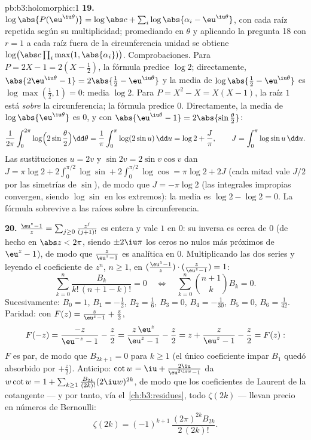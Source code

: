 \begin{solution}{pb:b3:holomorphic:1}
\textbf{19.} $\log\abs{P(\eu^{\iu\theta})} = \log\abs c +
\sum_i\log\abs{\alpha_i - \eu^{\iu\theta}}$, con cada raíz repetida
según su multiplicidad; promediando en $\theta$ y aplicando la pregunta
18 con $r = 1$ a cada raíz fuera de la circunferencia unidad se obtiene
$\log\bigl(\abs c\prod_i\max(1,
\abs{\alpha_i})\bigr)$. Comprobaciones. Para $P = 2X - 1 = 2(X -
\frac12)$, la fórmula predice $\log 2$; directamente,
$\abs{2\eu^{\iu\theta} - 1} = 2\abs{\frac12 -
\eu^{\iu\theta}}$ y la media de $\log\abs{\frac12 -
\eu^{\iu\theta}}$ es $\log\max(\frac12, 1) = 0$: media $\log
2$. Para $P = X^2 - X = X(X - 1)$, la raíz $1$ está \emph{sobre} la
circunferencia; la fórmula predice $0$. Directamente, la media de
$\log\abs{\eu^{\iu\theta}}$ es $0$, y con
$\abs{\eu^{\iu\theta} - 1} = 2\abs{\sin\frac\theta2}$:
\[
\frac1{2\pi}\int_0^{2\pi}
\log\Bigl(2\sin\frac\theta2\Bigr)\dd\theta
= \frac1\pi\int_0^\pi\log(2\sin u)\,\dd u
= \log 2 + \frac J\pi,
\qquad J = \int_0^\pi\log\sin u\,\dd u .
\]
Las sustituciones $u = 2v$ y $\sin 2v = 2\sin v\cos v$ dan
$J = \pi\log2 + 2\int_0^{\pi/2}\log\sin +
2\int_0^{\pi/2}\log\cos = \pi\log 2 + 2J$ (cada mitad vale $J/2$ por las
simetrías de $\sin$), de modo que $J = -\pi\log 2$ (las integrales
impropias convergen, siendo $\log\sin$
 en los extremos): la media es
$\log2 - \log2 = 0$. La fórmula sobrevive a las raíces sobre la
circunferencia.

\textbf{20.} $\frac{\eu^z - 1}z =
\sum_{j\geq0}\frac{z^j}{(j+1)!}$ es entera y vale $1$ en $0$: su inversa
es  cerca de $0$ (de hecho en
$\abs z <
2\pi$, siendo $\pm2\iu\pi$ los ceros no nulos más próximos de
$\eu^z - 1$), de modo que $\frac z{\eu^z-1}$ es analítica en $0$.
Multiplicando las dos series y leyendo el coeficiente de $z^n$,
$n \geq 1$, en $(\frac{\eu^z-1}z)\cdot(\frac
z{\eu^z-1}) = 1$:
\[
\sum_{k=0}^{n}\frac{B_k}{k!\,(n+1-k)!} = 0
\quad\Longleftrightarrow\quad
\sum_{k=0}^{n}\binom{n+1}{k}B_k = 0 .
\]
Sucesivamente: $B_0 = 1$, $B_1 = -\frac12$, $B_2 = \frac16$, $B_3 = 0$,
$B_4 = -\frac1{30}$, $B_5 = 0$, $B_6 =
\frac1{42}$. Paridad: con $F(z) = \frac z{\eu^z-1} +
\frac z2$,
\[
F(-z) = \frac{-z}{\eu^{-z} - 1} - \frac z2
= \frac{z\,\eu^z}{\eu^z - 1} - \frac z2
= z + \frac{z}{\eu^z - 1} - \frac z2 = F(z) :
\]
$F$ es par, de modo que $B_{2k+1} = 0$ para $k \geq 1$ (el único
coeficiente impar $B_1$ quedó absorbido por $+\frac z2$). Anticipo:
$\cot w = \iu + \frac{2\iu}{\eu^{2\iu w}-1}$ da
$w\cot w = 1 + \sum_{k\geq1}\frac{B_{2k}}{(2k)!}(2\iu
w)^{2k}$, de modo que los coeficientes de Laurent de la cotangente --- y
por tanto, vía el~\cref{ch:b3:residues}, todo $\zeta(2k)$ --- llevan
precio en números de Bernoulli:
\[
\zeta(2k) = (-1)^{k+1}\,\frac{(2\pi)^{2k}B_{2k}}{2\,(2k)!} .
\]


\end{solution}
